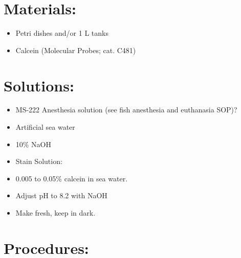 \documentclass[
  letterpaper,
  DIV=11,
  numbers=noendperiod]{scrreprt}
\providecommand{\tightlist}{%
  \setlength{\itemsep}{0pt}\setlength{\parskip}{0pt}}\usepackage{longtable,booktabs,array}
\begin{document}
\hypertarget{materials-60}{%
\section{Materials:}\label{materials-60}}

\begin{itemize}
\tightlist
\item
  Petri dishes and/or 1 L tanks
\item
  Calcein (Molecular Probes; cat. C481)
\end{itemize}

\hypertarget{solutions-51}{%
\section{Solutions:}\label{solutions-51}}

\begin{itemize}
\tightlist
\item
  MS-222 Anesthesia solution (see fish anesthesia and euthanasia SOP)?
\item
  Artificial sea water
\item
  10\% NaOH
\item
  Stain Solution:
\item
  0.005 to 0.05\% calcein in sea water.
\item
  Adjust pH to 8.2 with NaOH
\item
  Make fresh, keep in dark.
\end{itemize}

\hypertarget{procedures-2}{%
\section{Procedures:}\label{procedures-2}}
\end{document}
